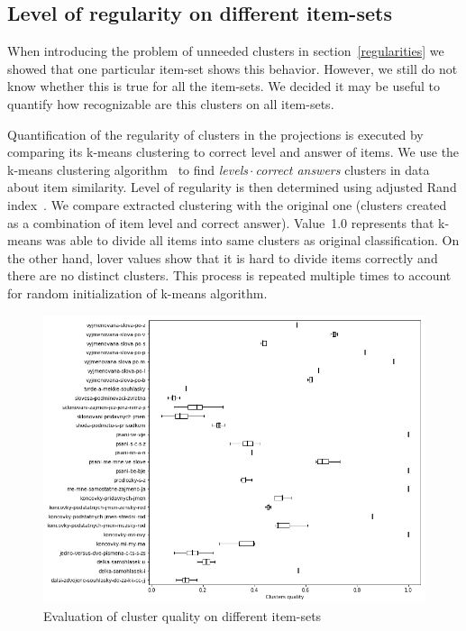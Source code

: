 \documentclass[
  print, %
  table,   %
  nolof,     %
  nolot,     %
  nocover,
  color,
  final,
]{fithesis3}
\begin{document}

\subsection{Level of regularity on different item-sets}\label{level-of-regularity-on-different-item-sets}

When introducing the problem of unneeded clusters in section~\ref{regularities} we showed that one particular item-set shows this behavior. However, we still do not know whether this is true for all the item-sets. We decided it may be useful to quantify how recognizable are this clusters on all item-sets.


Quantification of the regularity of clusters in the projections is executed by comparing its k-means clustering to correct level and answer of items. We use the k-means clustering algorithm~\cite{hartigan1979algorithm} to find \textit{levels\,$\cdot$\,correct answers} clusters in data about item similarity. Level of regularity is then determined using adjusted Rand index~\cite{santos2009use}. We compare extracted clustering with the original one (clusters created as a combination of item level and correct answer). Value~1.0 represents that k-means was able to divide all items into same clusters as original classification. On the other hand, lover values show that it is hard to divide items correctly and there are no distinct clusters. This process is repeated multiple times to account for random initialization of k-means algorithm.

\begin{figure}
  \includegraphics[width=\textwidth]{img/clustering_quality}
  \caption{Evaluation of cluster quality on different item-sets}
  \label{fig:clustering_quality}
\end{figure}
\end{document}
